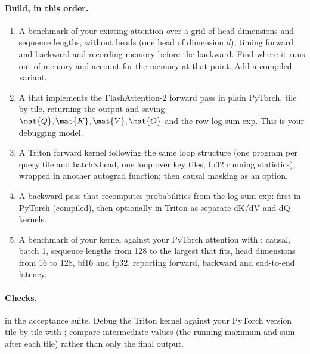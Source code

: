 \paragraph{Build, in this order.}
\begin{enumerate}
\item A benchmark of your existing attention over a grid of head dimensions and sequence lengths,
  without heads (one head of dimension $d$), timing forward and backward and recording memory before
  the backward. Find where it runs out of memory and account for the memory at that point. Add a
  compiled variant.
\item A  that implements the FlashAttention-2 forward pass in plain
  PyTorch, tile by tile, returning the output and saving $\mat{Q},\mat{K},\mat{V},\mat{O}$ and the
  row log-sum-exp. This is your debugging model.
\item A Triton forward kernel following the same loop structure (one program per query tile and
  batch$\times$head, one loop over key tiles, fp32 running statistics), wrapped in another autograd
  function; then causal masking as an option.
\item A backward pass that recomputes probabilities from the log-sum-exp: first in PyTorch (compiled),
  then optionally in Triton as separate dK/dV and dQ kernels.
\item A benchmark of your kernel against your PyTorch attention with :
  causal, batch 1, sequence lengths from 128 to the largest that fits, head dimensions from 16 to 128,
  bf16 and fp32, reporting forward, backward and end-to-end latency.
\end{enumerate}

\paragraph{Checks.}  in the acceptance suite. Debug the Triton kernel against your
PyTorch version tile by tile with ; compare intermediate values (the running
maximum and sum after each tile) rather than only the final output.

